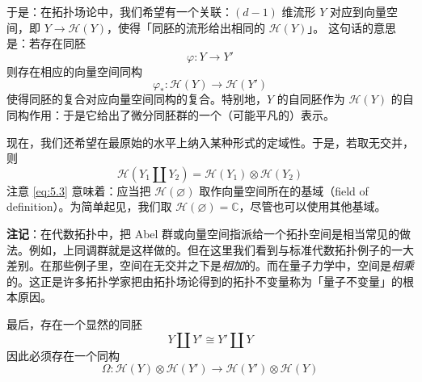 于是：在拓扑场论中，我们希望有一个关联：$(d-1)$ 维流形 $Y$ 对应到向量空间，即 $Y\to\mathcal{H}(Y)$，使得「同胚的流形给出相同的 $\mathcal{H}(Y)$」。
这句话的意思是：若存在同胚
\begin{equation}
  \varphi:Y\to Y'
  \tag{5.1}
  \label{eq:5.1}
\end{equation}
则存在相应的向量空间同构
\begin{equation}
  \varphi_*:\mathcal{H}(Y)\to\mathcal{H}(Y')
  \tag{5.2}
  \label{eq:5.2}
\end{equation}
使得同胚的复合对应向量空间同构的复合。特别地，$Y$ 的自同胚作为 $\mathcal{H}(Y)$ 的自同构作用：于是它给出了微分同胚群的一个（可能平凡的）表示。

现在，我们还希望在最原始的水平上纳入某种形式的定域性。于是，若取无交并，则
\begin{equation}
  \mathcal{H}(Y_1\coprod Y_2)=\mathcal{H}(Y_1)\otimes\mathcal{H}(Y_2)
  \tag{5.3}
  \label{eq:5.3}
\end{equation}
注意 \eqref{eq:5.3} 意味着：应当把 $\mathcal{H}(\varnothing)$ 取作向量空间所在的基域（field of definition）。为简单起见，我们取 $\mathcal{H}(\varnothing)=\mathbb{C}$，尽管也可以使用其他基域。

\textbf{注记}：在代数拓扑中，把 Abel 群或向量空间指派给一个拓扑空间是相当常见的做法。例如，上同调群就是这样做的。但在这里我们看到与标准代数拓扑例子的一大差别。在那些例子里，空间在无交并之下是\emph{相加}的。而在量子力学中，空间是\emph{相乘}的。这正是许多拓扑学家把由拓扑场论得到的拓扑不变量称为「量子不变量」的根本原因。

最后，存在一个显然的同胚
\begin{equation}
  Y\coprod Y'\cong Y'\coprod Y
  \tag{5.4}
  \label{eq:5.4}
\end{equation}
因此必须存在一个同构
\begin{equation}
  \Omega:\mathcal{H}(Y)\otimes\mathcal{H}(Y')\to\mathcal{H}(Y')\otimes\mathcal{H}(Y)
  \tag{5.5}
  \label{eq:5.5}
\end{equation}

